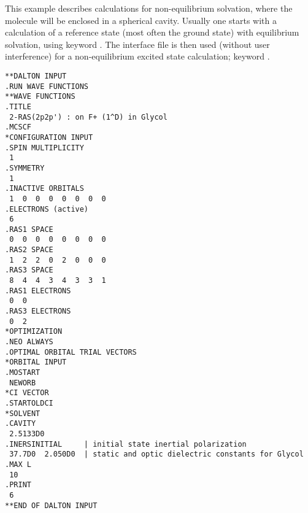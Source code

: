 \begin{center}
\end{center}

This example describes calculations for non-equilibrium
solvation, where the mole\-cule will
be enclosed in a spherical cavity. Usually one starts
with a calculation of a reference state (most often the ground
state) with equilibrium solvation, using keyword . The
interface file is then used (without user interference) for a
non-equilibrium excited state calculation; keyword .

\begin{verbatim}
**DALTON INPUT
.RUN WAVE FUNCTIONS
**WAVE FUNCTIONS
.TITLE
 2-RAS(2p2p') : on F+ (1^D) in Glycol
.MCSCF
*CONFIGURATION INPUT
.SPIN MULTIPLICITY
 1
.SYMMETRY
 1
.INACTIVE ORBITALS
 1  0  0  0  0  0  0  0
.ELECTRONS (active)
 6
.RAS1 SPACE
 0  0  0  0  0  0  0  0
.RAS2 SPACE
 1  2  2  0  2  0  0  0
.RAS3 SPACE
 8  4  4  3  4  3  3  1
.RAS1 ELECTRONS
 0  0
.RAS3 ELECTRONS
 0  2
*OPTIMIZATION
.NEO ALWAYS
.OPTIMAL ORBITAL TRIAL VECTORS
*ORBITAL INPUT
.MOSTART
 NEWORB
*CI VECTOR
.STARTOLDCI
*SOLVENT
.CAVITY
 2.5133D0
.INERSINITIAL     | initial state inertial polarization
 37.7D0  2.050D0  | static and optic dielectric constants for Glycol
.MAX L
 10
.PRINT
 6
**END OF DALTON INPUT
\end{verbatim}
\label{sirius_ex8}
